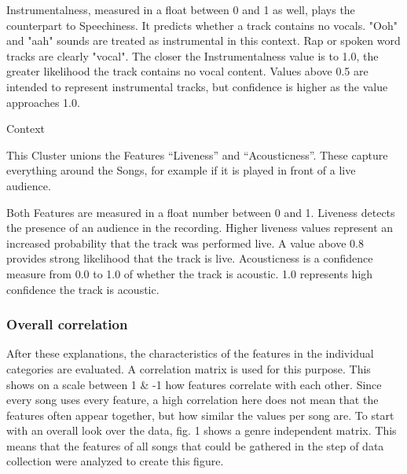 Instrumentalness, measured in a float between 0 and 1 as well, plays the counterpart to Speechiness. It predicts whether a track contains no vocals. 
"Ooh" and "aah" sounds are treated as instrumental in this context. Rap or spoken word tracks are clearly "vocal". 
The closer the Instrumentalness value is to 1.0, the greater likelihood the track contains no vocal content. 
Values above 0.5 are intended to represent instrumental tracks, but confidence is higher as the value approaches 1.0.

Context

This Cluster unions the Features “Liveness” and “Acousticness”. These capture everything around the Songs, for example if it is played in front of a live audience.

Both Features are measured in a float number between 0 and 1. Liveness detects the presence of an audience in the recording. 
Higher liveness values represent an increased probability that the track was performed live. A value above 0.8 provides strong likelihood that the track is live. 
Acousticness is a confidence measure from 0.0 to 1.0 of whether the track is acoustic. 1.0 represents high confidence the track is acoustic. 

\subsubsection{Overall correlation}
After these explanations, the characteristics of the features in the individual categories are evaluated. A correlation matrix is used for this purpose. This shows on a scale between 1 & -1 how features correlate with each other. Since every song uses every feature, a high correlation here does not mean that the features often appear together, but how similar the values per song are. To start with an overall look over the data, fig. 1  shows a genre independent matrix. This means that the features of all songs that could be gathered in the step of data collection were analyzed to create this figure. 

